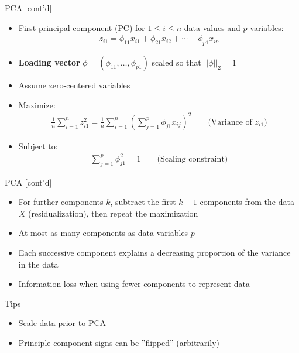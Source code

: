 \documentclass[ignorenonframetext,xcolor=x11names]{beamer}
\begin{document}
\begin{frame}[label=full]{PCA \small [cont'd]}
\begin{itemize}
\item First principal component (PC) for $1 \leq i \leq n$ data values and $p$ variables:
\begin{align*}
z_{i1} = \phi_{11} x_{i1} + \phi_{21} x_{i2} + \cdots + \phi_{p1} x_{ip}
\end{align*}
\item \textbf{Loading vector} $\phi = (\phi_{11}, \ldots , \phi_{p1})$ scaled so that $||\phi||_2 = 1$
\item Assume zero-centered variables
\item Maximize:
\begin{align*}
\frac{1}{n} \sum_{i=1}^n z_{i1}^2 = \frac{1}{n}\sum_{i=1}^n \left( \sum_{j=1}^p \phi_{j1}x_{ij} \right)^2 \qquad \text{(Variance of $z_{i1}$)} 
\end{align*}
\item Subject to:
\begin{align*}
\sum_{j=1}^p \phi_{j1}^2 = 1 \qquad \text{(Scaling constraint)}
\end{align*}
\end{itemize}
\end{frame}

\begin{frame}[label=full]{PCA \small [cont'd]}
\begin{itemize}
\item For further components $k$, subtract the first $k-1$ components from the data $X$ (residualization), then repeat the maximization
\item At most as many components as data variables $p$
\item Each successive component explains a decreasing proportion of the variance in the data
\item Information loss when using fewer components to represent data
\end{itemize}
\begin{block}{Tips}
\begin{itemize}
  \item Scale data prior to PCA
  \item Principle component signs can be ''flipped'' (arbitrarily)
\end{itemize}
\end{block}
\end{frame}
\end{document}
